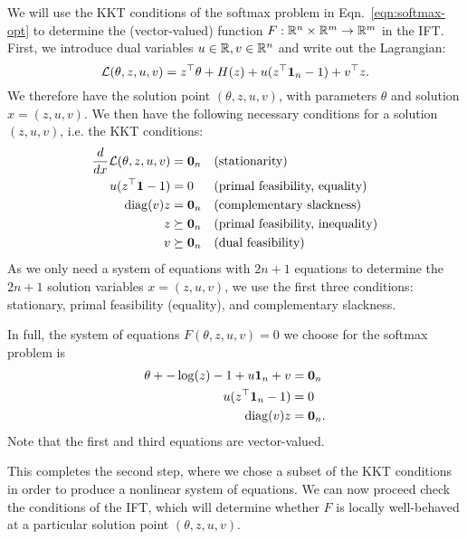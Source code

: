 \documentclass[11pt]{article}
\begin{document}
We will use the KKT conditions of the softmax problem in
Eqn.~\ref{eqn:softmax-opt} to determine the (vector-valued) function $F:\mathbb{R}^n\times\mathbb{R}^m\to\mathbb{R}^m$
in the IFT.
First, we introduce dual variables $u\in\mathbb{R},v\in\mathbb{R}^n$ and write out the Lagrangian:
$$\mathcal{L}(\theta, z, u, v) = z^\top\theta + H(z) + u(z^\top \mathbf{1}_n - 1) + v^\top z.$$
We therefore have the solution point $(\theta,z,u,v)$, with parameters $\theta$
and solution $x=(z,u,v)$.
We then have the following necessary conditions for a solution $(z,u,v)$,
i.e. the KKT conditions:
\begin{equation}
\begin{aligned}
\frac{d}{dx} \mathcal{L}(\theta, z,u,v) &= \mathbf{0}_n && \textrm{(stationarity)}\\
u(z^{\top} \mathbf{1} - 1) &= 0 && \textrm{(primal feasibility, equality)}\\
\mathrm{diag}(v)z &= \mathbf{0}_{n} && \textrm{(complementary slackness)}\\
z &\succeq \mathbf{0}_n && \textrm{(primal feasibility, inequality)}\\
v &\succeq \mathbf{0}_n && \textrm{(dual feasibility)}
\end{aligned}
\end{equation}
As we only need a system of equations with $2n+1$ equations to
determine the $2n+1$ solution variables $x=(z,u,v)$,
we use the first three conditions: stationary, primal feasibility (equality),
and complementary slackness.

In full, the system of equations $F(\theta, z,u,v) = 0$ we choose
for the softmax problem is
\begin{equation}
\label{eqn:system}
\begin{aligned}
\theta + -\log(z) - 1 + u\mathbf{1}_n + v &= \mathbf{0}_n\\
u(z^{\top} \mathbf{1}_n - 1) &= 0\\
\mathrm{diag}(v)z &= \mathbf{0}_n.
\end{aligned}
\end{equation}
Note that the first and third equations are vector-valued.

This completes the second step, where we chose a subset of the KKT conditions
in order to produce a nonlinear system of equations.
We can now proceed check the conditions of the IFT,
which will determine whether $F$ is locally well-behaved
at a particular solution point $(\theta, z,u,v)$.
\end{document}
